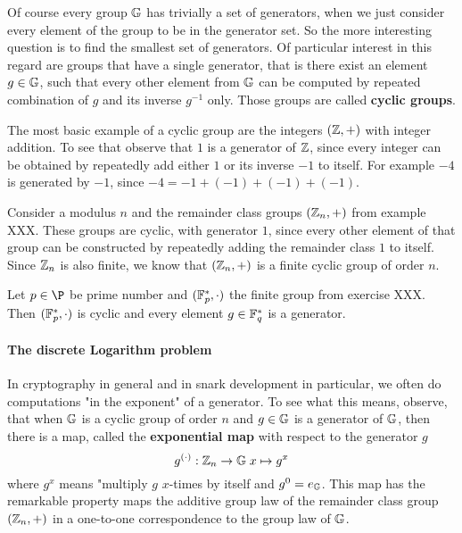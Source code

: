 Of course every group $\mathbb{G}$ has trivially a set of generators, when we just consider every element of the group to be in the generator set. So the more interesting question is to find the smallest set of generators. Of particular interest in this regard are groups that have a single generator, that is there exist an element $g\in\mathbb{G}$, such that every other element from $\mathbb{G}$ can be computed by repeated combination of $g$ and its inverse $g^{-1}$ only. Those groups are called \textbf{cyclic groups}.
\begin{example} The most basic example of a cyclic group are the integers $(\mathbb{Z},+)$ with integer addition. To see that observe that $1$ is a generator of $\mathbb{Z}$, since every integer can be obtained by repeatedly add either $1$ or its inverse $-1$ to itself. For example
$-4$ is generated by $-1$, since $-4=-1+(-1)+(-1)+(-1)$.
\end{example}
\begin{example} Consider a modulus $n$ and the remainder class groups $(\mathbb{Z}_n,+)$ from example XXX. These groups are cyclic, with generator $1$, since every other element of that group can be constructed by repeatedly adding the remainder class $1$ to itself. Since $\mathbb{Z}_n$ is also finite, we know that $(\mathbb{Z}_n,+)$ is a finite cyclic group of order $n$.
\end{example}
\begin{example} Let $p\in\P$ be prime number and $(\mathbb{F}_p^*,\cdot)$ the finite group from exercise XXX. Then $(\mathbb{F}_p^*,\cdot)$ is cyclic and every element $g\in\mathbb{F}_q^*$ is a generator.
\end{example}
\paragraph{The discrete Logarithm problem}
In cryptography in general and in snark development in particular, we often do computations "in the exponent" of a generator. To see what this means, observe, that when
$\mathbb{G}$ is a cyclic group of order $n$ and $g\in \mathbb{G}$ is a generator of $\mathbb{G}$, then there is a map, called the \textbf{exponential map} with respect to the generator $g$
\begin{equation}
g^{(\cdot)}: \mathbb{Z}_n \to \mathbb{G}\; x \mapsto g^x
\end{equation}
where $g^x$ means "multiply $g$ $x$-times by itself and $g^0=e_{\mathbb{G}}$. This map has the remarkable property maps the additive group law of the remainder class group $(\mathbb{Z}_n,+)$ in a one-to-one correspondence to the group law of $\mathbb{G}$.

